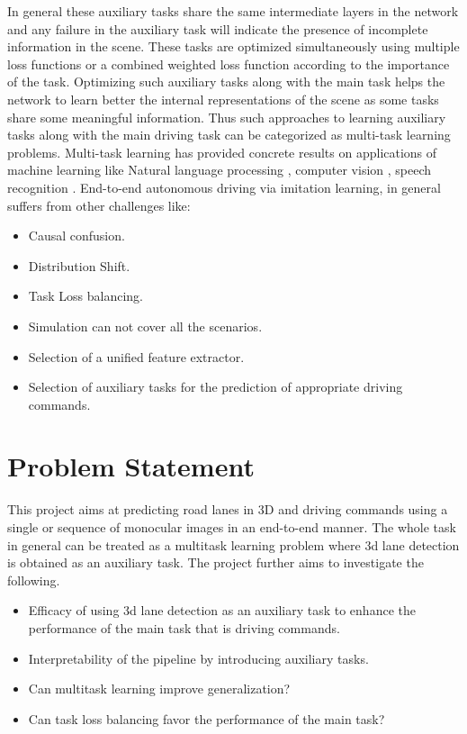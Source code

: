 \par In general these auxiliary tasks share the same intermediate layers in the network and any failure in the auxiliary task will indicate the presence of incomplete information in the scene. These tasks are optimized simultaneously using multiple loss functions or a combined weighted loss function according to the importance of the task. Optimizing such auxiliary tasks along with the main task helps the network to learn better the internal representations of the scene as some tasks share some meaningful information. Thus such approaches to learning auxiliary tasks along with the main driving task can be categorized as  multi-task learning problems. Multi-task learning has provided concrete results on applications of machine learning like Natural language processing \cite{nlp}, computer vision \cite{DBLP:journals/corr/abs-2002-05347}, speech recognition \cite{qiu2021multitask}.    
End-to-end autonomous driving via imitation learning, in general suffers from other challenges like: 

\begin{itemize}
\item Causal confusion.
\item Distribution Shift.
\item Task Loss balancing.
\item Simulation can not cover all the scenarios.
\item Selection of a unified feature extractor.
\item Selection of auxiliary tasks for the prediction of appropriate driving commands. 
\end{itemize}

    \section{Problem Statement}
    This project aims at predicting road lanes in 3D and driving commands using a single or sequence of monocular images in an end-to-end manner. The whole task in general can be treated as a multitask learning problem where 3d lane detection is obtained as an auxiliary task. The project further aims to investigate the following.
    
    \begin{itemize}
 \item Efficacy of using 3d lane detection as an auxiliary task to enhance the performance of the main task that is driving commands.
\item Interpretability of the pipeline by introducing auxiliary tasks. 
\item Can multitask learning improve generalization? 
\item Can task loss balancing favor the performance of the main task?  
\end{itemize}

